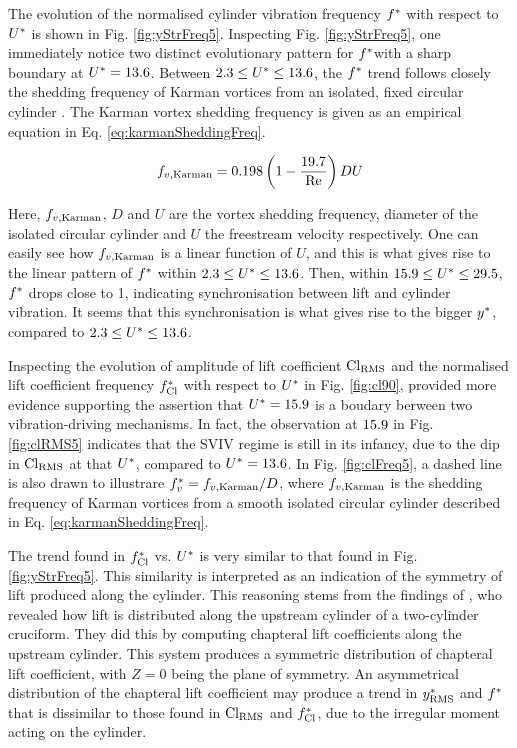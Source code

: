 \documentclass[oneside]{utmthesis}
\begin{document}
The evolution of the normalised cylinder vibration frequency $f^{*}$ with respect to $U^{*}$ is shown in Fig. \ref{fig:yStrFreq5}. Inspecting Fig. \ref{fig:yStrFreq5}, one immediately notice two distinct evolutionary pattern for $f^{*}$with a sharp boundary at $U^{*} = 13.6$. Between $2.3 \leq U^{*} \leq 13.6$, the $f^{*}$ trend follows closely the shedding frequency of Karman vortices from an isolated, fixed circular cylinder \citep{Blevins1990}. The Karman vortex shedding frequency is given as an empirical equation in Eq. \ref{eq:karmanSheddingFreq}.

\begin{equation}
  f_{v,\text{Karman}} = 0.198 \left( 1 - \frac{19.7}{\text{Re}} \right) DU
  \label{eq:karmanSheddingFreq}
\end{equation}

\noindent Here, $f_{v,\text{Karman}}$, $D$ and $U$ are the vortex shedding frequency, diameter of the isolated circular cylinder and $U$ the freestream velocity respectively. One can easily see how $f_{v,\text{Karman}}$ is a linear function of $U$, and this is what gives rise to the linear pattern of $f^{*}$ within $2.3 \leq U^{*} \leq 13.6$. Then, within $15.9 \leq U^{*} \leq 29.5$, $f^{*}$ drops close to 1, indicating synchronisation between lift and cylinder vibration. It seems that this synchronisation is what gives rise to the bigger $y^{*}$, compared to $2.3 \leq U^{*} \leq 13.6$.

Inspecting the evolution of \rms{} amplitude of lift coefficient $\text{Cl}_{\text{RMS}}$ and the normalised lift coefficient frequency $f_{\text{Cl}}^{*}$ with respect to $U^{*}$ in Fig. \ref{fig:cl90}, provided more evidence supporting the assertion that $U^{*} = 15.9$ is a boudary berween two vibration-driving mechanisms. In fact, the observation at $15.9$ in Fig. \ref{fig:clRMS5} indicates that the SVIV regime is still in its infancy, due to the dip in $\text{Cl}_{\text{RMS}}$ at that $U^{*}$, compared to $U^{*} = 13.6$. In Fig. \ref{fig:clFreq5}, a dashed line is also drawn to illustrare $f^{*}_{v} = f_{v,\text{Karman}}/D$, where $f_{v,\text{Karman}}$ is the shedding frequency of Karman vortices from a smooth isolated circular cylinder described in Eq. \ref{eq:karmanSheddingFreq}.

The trend found in $f_{\text{Cl}}^{*}$ vs. $U^{*}$ is very similar to that found in Fig. \ref{fig:yStrFreq5}. This similarity is interpreted as an indication of the symmetry of lift produced along the cylinder. This reasoning stems from the findings of \citet{Zhao2018a}, who revealed how lift is distributed along the upstream cylinder of a two-cylinder \angfi{} cruciform. They did this by computing chapteral lift coefficients along the upstream cylinder. This system produces a symmetric distribution of chapteral lift coefficient, with $Z = 0$ being the plane of symmetry. An asymmetrical distribution of the chapteral lift coefficient may produce a trend in $y^{*}_{\text{RMS}}$ and $f^{*}$ that is dissimilar to those found in $\text{Cl}_{\text{RMS}}$ and $f_{\text{Cl}}^{*}$, due to the irregular moment acting on the cylinder.
\end{document}
